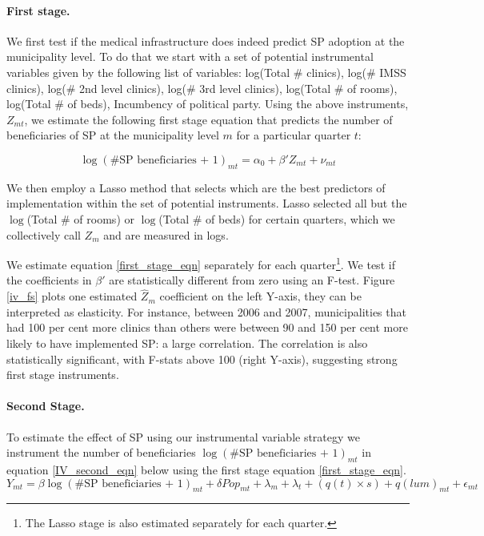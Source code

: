 \documentclass[oneside,11pt]{article}
\begin{document}
\paragraph{First stage.} We first test if the medical infrastructure does indeed predict SP adoption at the municipality level. To do that we start with a set of potential instrumental variables given by the following list of variables: log(Total \# clinics), log(\# IMSS clinics), log(\# 2nd level clinics), log(\# 3rd level clinics), log(Total \# of rooms), log(Total \# of beds), Incumbency of political party. Using the above instruments, $Z_{mt}$, we estimate the following first stage equation that predicts the number of beneficiaries of SP at the municipality level $m$ for a particular quarter $t$:

\begin{equation} \label{first_stage_eqn}
    \log(\# \text{SP beneficiaries + 1})_{mt}= \alpha_0 + \beta'Z_{mt} + \nu_{mt}
\end{equation}

We then employ a Lasso method that selects which are the best predictors of implementation within the set of potential instruments. Lasso selected all but the  $\log$(Total \# of rooms) or  $\log$(Total \# of beds) for certain quarters, which we collectively call $Z_m$ and are measured in logs.

\noindent We estimate equation \ref{first_stage_eqn} separately for each quarter\footnote{The Lasso stage is also estimated separately for each quarter.}. We test if the coefficients in $\beta'$ are statistically different from zero using an F-test. Figure \ref{iv_fs} plots one estimated $\hat{Z}_m$ coefficient on the left Y-axis, they can be interpreted as elasticity. For instance, between 2006 and 2007, municipalities that had 100 per cent more clinics than others were between 90 and 150 per cent more likely to have implemented SP: a large correlation. The correlation is also statistically significant, with F-stats above 100 (right Y-axis), suggesting strong first stage instruments.


\paragraph{Second Stage.}  To estimate the effect of SP using our instrumental variable strategy we instrument the number of beneficiaries $\log(\# \text{SP beneficiaries + 1})_{mt}$ in equation \ref{IV_second_eqn} below using the first stage equation \ref{first_stage_eqn}.
\begin{equation} \label{IV_second_eqn}
    Y_{mt}=\beta \log(\# \text{SP beneficiaries + 1})_{mt}+\delta Pop_{mt} + \lambda_m + \lambda_t + (q(t)\times s) + q(lum)_{mt} + \epsilon_{mt}
\end{equation}
\end{document}
